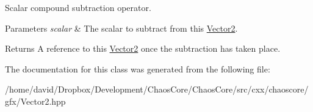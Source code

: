 Scalar compound subtraction operator. 


\begin{DoxyParams}{Parameters}
{\em scalar} & The scalar to subtract from this \hyperlink{classchaos_1_1gfx_1_1_vector2}{Vector2}. \\
\hline
\end{DoxyParams}
\begin{DoxyReturn}{Returns}
A reference to this \hyperlink{classchaos_1_1gfx_1_1_vector2}{Vector2} once the subtraction has taken place. 
\end{DoxyReturn}


The documentation for this class was generated from the following file\-:\begin{DoxyCompactItemize}
\item 
/home/david/\-Dropbox/\-Development/\-Chaos\-Core/\-Chaos\-Core/src/cxx/chaoscore/gfx/Vector2.\-hpp\end{DoxyCompactItemize}
